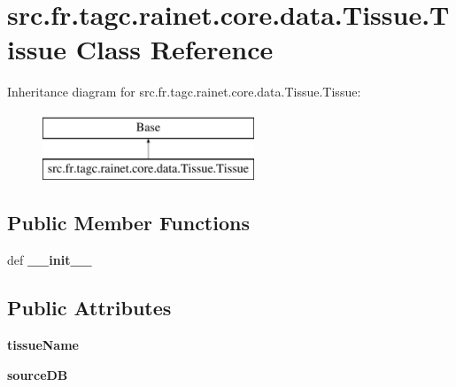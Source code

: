 \hypertarget{classsrc_1_1fr_1_1tagc_1_1rainet_1_1core_1_1data_1_1Tissue_1_1Tissue}{\section{src.\-fr.\-tagc.\-rainet.\-core.\-data.\-Tissue.\-Tissue Class Reference}
\label{classsrc_1_1fr_1_1tagc_1_1rainet_1_1core_1_1data_1_1Tissue_1_1Tissue}
}
Inheritance diagram for src.\-fr.\-tagc.\-rainet.\-core.\-data.\-Tissue.\-Tissue\-:\begin{figure}[H]
\begin{center}
\leavevmode
\includegraphics[height=2.000000cm]{classsrc_1_1fr_1_1tagc_1_1rainet_1_1core_1_1data_1_1Tissue_1_1Tissue}
\end{center}
\end{figure}
\subsection*{Public Member Functions}
\begin{DoxyCompactItemize}
\item 
\hypertarget{classsrc_1_1fr_1_1tagc_1_1rainet_1_1core_1_1data_1_1Tissue_1_1Tissue_a04b6640e0bb3ef44c848a9488dc8a375}{def {\bfseries \-\_\-\-\_\-init\-\_\-\-\_\-}}\label{classsrc_1_1fr_1_1tagc_1_1rainet_1_1core_1_1data_1_1Tissue_1_1Tissue_a04b6640e0bb3ef44c848a9488dc8a375}

\end{DoxyCompactItemize}
\subsection*{Public Attributes}
\begin{DoxyCompactItemize}
\item 
\hypertarget{classsrc_1_1fr_1_1tagc_1_1rainet_1_1core_1_1data_1_1Tissue_1_1Tissue_adb9ff76a348101bebc22fe2627372606}{{\bfseries tissue\-Name}}\label{classsrc_1_1fr_1_1tagc_1_1rainet_1_1core_1_1data_1_1Tissue_1_1Tissue_adb9ff76a348101bebc22fe2627372606}

\item 
\hypertarget{classsrc_1_1fr_1_1tagc_1_1rainet_1_1core_1_1data_1_1Tissue_1_1Tissue_adb76d0e0c790c2394157bd3a69a8807a}{{\bfseries source\-D\-B}}\label{classsrc_1_1fr_1_1tagc_1_1rainet_1_1core_1_1data_1_1Tissue_1_1Tissue_adb76d0e0c790c2394157bd3a69a8807a}

\end{DoxyCompactItemize}
